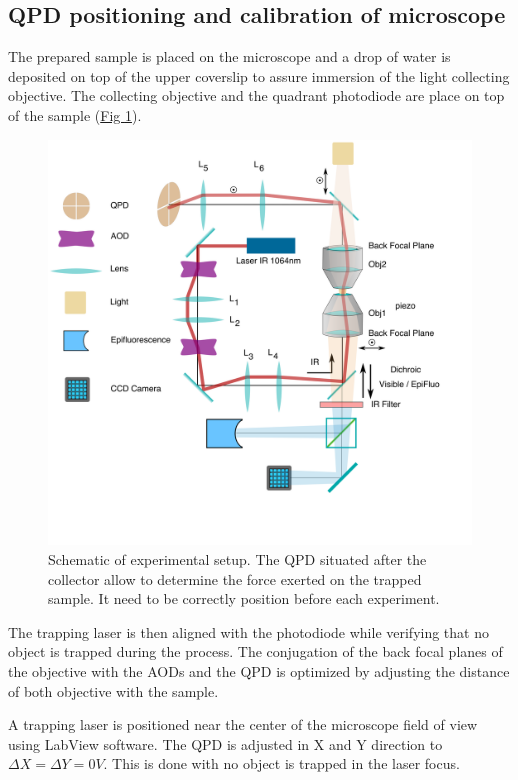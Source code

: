 \documentclass[A4paperpaper,11pt,english]{sphinxmanual}
\begin{document}
\subsection{QPD positioning and calibration of microscope}
\label{parts/part2:laser-calibration}\label{parts/part2:qpd-positioning-and-calibration-of-microscope}
The prepared sample is placed on the microscope and a drop of water is
deposited on top of the upper coverslip to assure immersion of the light
collecting objective. The collecting objective and the quadrant photodiode are
place on top of the sample (\hyperref[parts/part2:ots-2]{Fig  \ref*{parts/part2:ots-2}}).
\begin{figure}[htbp]
\centering
\capstart

\includegraphics[width=0.600\linewidth]{setup-plus-1.png}
\caption{Schematic of experimental setup. The QPD situated after the collector allow
to determine the force exerted on the trapped sample. It need to be
correctly position before each experiment.}\label{parts/part2:ots-2}\end{figure}

The trapping laser is then aligned with the photodiode while verifying that no
object is trapped during the process. The conjugation of the back focal planes
of the objective with the AODs and the QPD is optimized by adjusting the
distance of both objective with the sample.

A trapping laser is positioned near the center of the microscope field of view
using LabView software. The QPD is adjusted in X and Y direction to
\(\Delta X  = \Delta Y = 0V\). This is done with no object is trapped in
the  laser focus.
\end{document}

